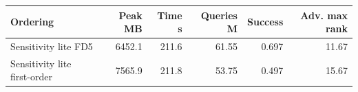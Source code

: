 \begin{tabular}{lrrrrr}
\toprule
Ordering & Peak MB & Time s & Queries M & Success & Adv. max rank \\
\midrule
Sensitivity lite FD5 & 6452.1 & 211.6 & 61.55 & 0.697 & 11.67 \\
Sensitivity lite first-order & 7565.9 & 211.8 & 53.75 & 0.497 & 15.67 \\
\bottomrule
\end{tabular}

